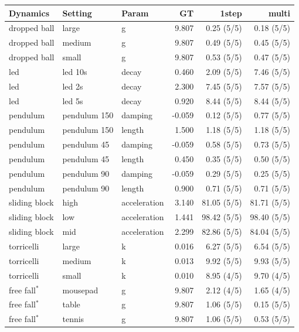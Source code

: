 \begin{tabular}{lll r r r}
\toprule
Dynamics & Setting & Param & GT & 1step & multi \\
\midrule
dropped ball & large & g & 9.807 & 0.25 (5/5) & 0.18 (5/5) \\
dropped ball & medium & g & 9.807 & 0.49 (5/5) & 0.45 (5/5) \\
dropped ball & small & g & 9.807 & 0.53 (5/5) & 0.47 (5/5) \\
led & led 10s & decay & 0.460 & 2.09 (5/5) & 7.46 (5/5) \\
led & led 2s & decay & 2.300 & 7.45 (5/5) & 7.57 (5/5) \\
led & led 5s & decay & 0.920 & 8.44 (5/5) & 8.44 (5/5) \\
pendulum & pendulum 150 & damping & -0.059 & 0.12 (5/5) & 0.77 (5/5) \\
pendulum & pendulum 150 & length & 1.500 & 1.18 (5/5) & 1.18 (5/5) \\
pendulum & pendulum 45 & damping & -0.059 & 0.58 (5/5) & 0.73 (5/5) \\
pendulum & pendulum 45 & length & 0.450 & 0.35 (5/5) & 0.50 (5/5) \\
pendulum & pendulum 90 & damping & -0.059 & 0.29 (5/5) & 0.25 (5/5) \\
pendulum & pendulum 90 & length & 0.900 & 0.71 (5/5) & 0.71 (5/5) \\
sliding block & high & acceleration & 3.140 & 81.05 (5/5) & 81.71 (5/5) \\
sliding block & low & acceleration & 1.441 & 98.42 (5/5) & 98.40 (5/5) \\
sliding block & mid & acceleration & 2.299 & 82.86 (5/5) & 84.04 (5/5) \\
torricelli & large & k & 0.016 & 6.27 (5/5) & 6.54 (5/5) \\
torricelli & medium & k & 0.013 & 9.92 (5/5) & 9.93 (5/5) \\
torricelli & small & k & 0.010 & 8.95 (4/5) & 9.70 (4/5) \\
free fall$^\ast$ & mousepad & g & 9.807 & 2.12 (4/5) & 1.65 (4/5) \\
free fall$^\ast$ & table & g & 9.807 & 1.06 (5/5) & 0.15 (5/5) \\
free fall$^\ast$ & tennis & g & 9.807 & 1.06 (5/5) & 0.53 (5/5) \\
\bottomrule
\end{tabular}
